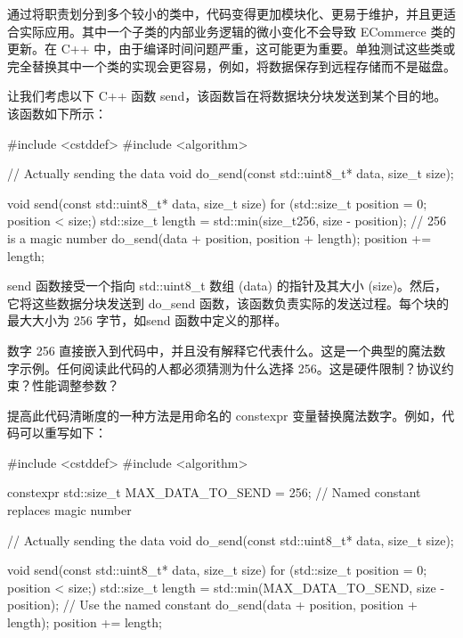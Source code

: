 通过将职责划分到多个较小的类中，代码变得更加模块化、更易于维护，并且更适合实际应用。其中一个子类的内部业务逻辑的微小变化不会导致 ECommerce 类的更新。在 C++ 中，由于编译时间问题严重，这可能更为重要。单独测试这些类或完全替换其中一个类的实现会更容易，例如，将数据保存到远程存储而不是磁盘。


让我们考虑以下 C++ 函数 send，该函数旨在将数据块分块发送到某个目的地。该函数如下所示：

\begin{cpp}
#include <cstddef>
#include <algorithm>

// Actually sending the data
void do_send(const std::uint8_t* data, size_t size);

void send(const std::uint8_t* data, size_t size) {
    for (std::size_t position = 0; position < size;) {
        std::size_t length = std::min(size_t{256}, size - position);
        // 256 is a magic number
        do_send(data + position, position + length);
        position += length;
    }
}
\end{cpp}


send 函数接受一个指向 std::uint8\_t 数组 (data) 的指针及其大小 (size)。然后，它将这些数据分块发送到 do\_send 函数，该函数负责实际的发送过程。每个块的最大大小为 256 字节，如send 函数中定义的那样。


数字 256 直接嵌入到代码中，并且没有解释它代表什么。这是一个典型的魔法数字示例。任何阅读此代码的人都必须猜测为什么选择 256。这是硬件限制？协议约束？性能调整参数？


提高此代码清晰度的一种方法是用命名的 constexpr 变量替换魔法数字。例如，代码可以重写如下：

\begin{cpp}
#include <cstddef>
#include <algorithm>

constexpr std::size_t MAX_DATA_TO_SEND = 256; // Named constant replaces magic number

// Actually sending the data
void do_send(const std::uint8_t* data, size_t size);

void send(const std::uint8_t* data, size_t size) {
    for (std::size_t position = 0; position < size;) {
        std::size_t length = std::min(MAX_DATA_TO_SEND, size - position); // Use the named constant
        do_send(data + position, position + length);
        position += length;
    }
}
\end{cpp}

